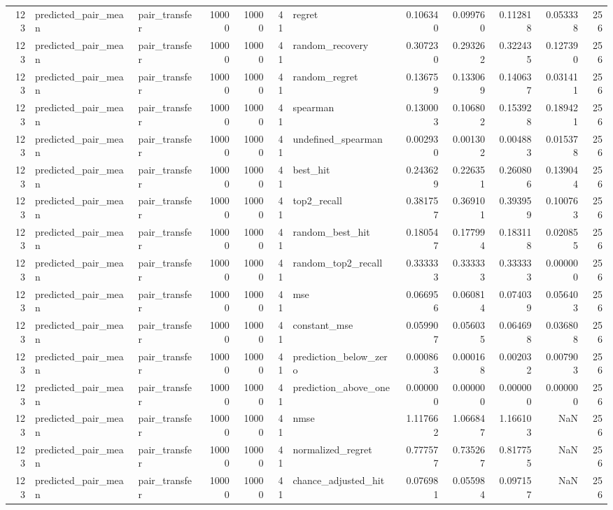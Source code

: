 \begin{tabular}{rllrrrlrrrrr}
123 & predicted_pair_mean & pair_transfer & 10000 & 10000 & 41 & regret & 0.106340 & 0.099760 & 0.112818 & 0.053338 & 256 \\
123 & predicted_pair_mean & pair_transfer & 10000 & 10000 & 41 & random_recovery & 0.307230 & 0.293262 & 0.322435 & 0.127390 & 256 \\
123 & predicted_pair_mean & pair_transfer & 10000 & 10000 & 41 & random_regret & 0.136759 & 0.133069 & 0.140637 & 0.031411 & 256 \\
123 & predicted_pair_mean & pair_transfer & 10000 & 10000 & 41 & spearman & 0.130003 & 0.106802 & 0.153928 & 0.189421 & 256 \\
123 & predicted_pair_mean & pair_transfer & 10000 & 10000 & 41 & undefined_spearman & 0.002930 & 0.001302 & 0.004883 & 0.015378 & 256 \\
123 & predicted_pair_mean & pair_transfer & 10000 & 10000 & 41 & best_hit & 0.243629 & 0.226351 & 0.260806 & 0.139044 & 256 \\
123 & predicted_pair_mean & pair_transfer & 10000 & 10000 & 41 & top2_recall & 0.381757 & 0.369101 & 0.393959 & 0.100763 & 256 \\
123 & predicted_pair_mean & pair_transfer & 10000 & 10000 & 41 & random_best_hit & 0.180547 & 0.177994 & 0.183118 & 0.020855 & 256 \\
123 & predicted_pair_mean & pair_transfer & 10000 & 10000 & 41 & random_top2_recall & 0.333333 & 0.333333 & 0.333333 & 0.000000 & 256 \\
123 & predicted_pair_mean & pair_transfer & 10000 & 10000 & 41 & mse & 0.066956 & 0.060814 & 0.074039 & 0.056403 & 256 \\
123 & predicted_pair_mean & pair_transfer & 10000 & 10000 & 41 & constant_mse & 0.059907 & 0.056035 & 0.064698 & 0.036808 & 256 \\
123 & predicted_pair_mean & pair_transfer & 10000 & 10000 & 41 & prediction_below_zero & 0.000863 & 0.000168 & 0.002032 & 0.007903 & 256 \\
123 & predicted_pair_mean & pair_transfer & 10000 & 10000 & 41 & prediction_above_one & 0.000000 & 0.000000 & 0.000000 & 0.000000 & 256 \\
123 & predicted_pair_mean & pair_transfer & 10000 & 10000 & 41 & nmse & 1.117662 & 1.066847 & 1.166103 & NaN & 256 \\
123 & predicted_pair_mean & pair_transfer & 10000 & 10000 & 41 & normalized_regret & 0.777577 & 0.735267 & 0.817755 & NaN & 256 \\
123 & predicted_pair_mean & pair_transfer & 10000 & 10000 & 41 & chance_adjusted_hit & 0.076981 & 0.055984 & 0.097157 & NaN & 256 \\

\end{tabular}
